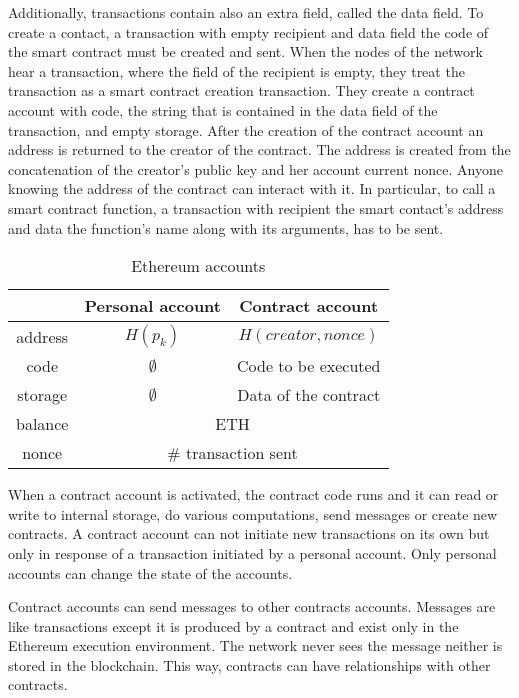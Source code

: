 Additionally, transactions contain also an extra field, called the data field. To create a contact, a transaction with empty recipient and data field the code of the smart contract must be created and sent. When the nodes of the network hear a transaction, where the field of the recipient is empty, they treat the transaction as a smart contract creation transaction. They create a contract account with code, the string that is contained in the data field of the transaction, and empty storage. After the creation of the contract account an address is returned to the creator of the contract. The address is created from the concatenation of the creator's public key and her account current nonce. Anyone knowing the address of the contract can interact with it. In particular, to call a smart contract function, a transaction with recipient the smart contact's address and data the function's name along with its arguments, has to be sent.

\begin{table}[!ht]
  \centering
  \begin{tabular}{|c|c|c|}
  \hline
   & Personal account  & Contract account \\ \hline
   address & $H(p_k)$ & $H(creator, nonce)$ \\ \hline
   code & $\emptyset$ & Code to be executed \\ \hline
   storage & $\emptyset$ & Data of the contract \\ \hline
   balance & \multicolumn{2}{c|}{ETH} \\ \hline
   nonce &  \multicolumn{2}{c|}{\# transaction sent}  \\ \hline
  \end{tabular}
  \caption{Ethereum accounts}
  \label{fig:eth_accounts}
\end{table}

When a contract account is activated, the contract code runs and it can read or write to internal storage, do various computations, send messages or create new contracts. A contract account can not initiate new transactions on its own but only in response of a transaction initiated by a personal account. Only personal accounts can change the state of the accounts.

Contract accounts can send messages to other contracts accounts. Messages are like transactions except it is produced by a contract and exist only in the Ethereum execution environment. The network never sees the message neither is stored in the blockchain. This way, contracts can have relationships with other contracts.

